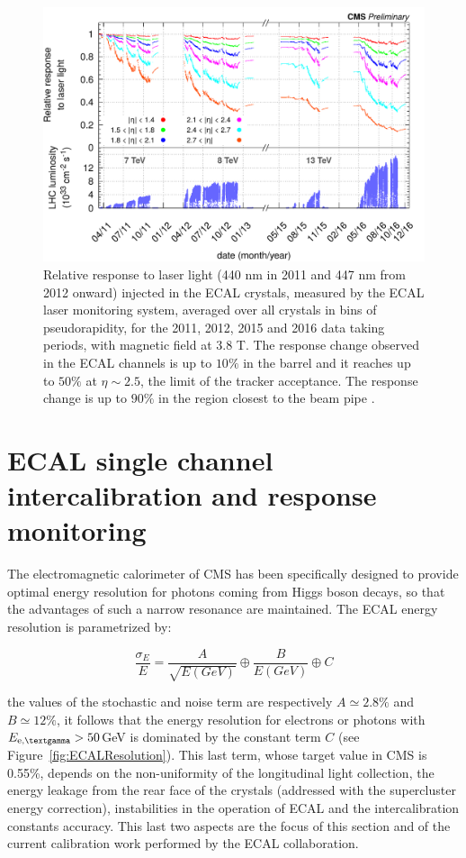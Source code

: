 \begin{figure}[h!]
  \centering
  \includegraphics[width = .9\textwidth]{figures/ecal/histories_2011-2012-2015-2016_161212.png}
  \caption{Relative response to laser light (440 nm in 2011 and 447 nm from
    2012 onward) injected in the ECAL crystals, measured by the ECAL
    laser monitoring system, averaged over all crystals in bins of
    pseudorapidity, for the 2011, 2012, 2015 and 2016 data taking periods,
    with magnetic field at 3.8 T. The response change observed in the
    ECAL channels is up to $10\%$ in the barrel and it reaches up to $50\%$ at $\eta\sim 2.5$,
    the limit of the tracker acceptance. The response change is up to $90\%$ in the region closest to the beam pipe
    \cite{laser_and_phisym}.}
  \label{fig:laser}
\end{figure}

\section{ECAL single channel intercalibration and response monitoring}
\label{sec:minchia_la_calibrazione}

The electromagnetic calorimeter of CMS has been specifically designed to provide optimal
energy resolution for photons coming from Higgs boson decays,
so that the advantages of such a narrow resonance are maintained.
The ECAL energy resolution is parametrized by:

\begin{equation}
\dfrac{\sigma_{E}}{E} = \dfrac{A}{\sqrt{E(GeV)}} \oplus
                        \dfrac{B}{E(GeV)}        \oplus
                        C
\end{equation} 

the values of the stochastic and noise term are respectively $A \simeq 2.8\%$ and $B \simeq 12\%$, it
follows that the energy resolution for electrons or photons with
$E_{\textnormal{e,\textgamma}} > 50$GeV is dominated by the constant term $C$ (see
Figure~\ref{fig:ECALResolution}). This last term, whose target value in CMS is 0.55\%, depends on
the non-uniformity of the longitudinal light collection, the energy leakage from the rear face of
the crystals (addressed with the supercluster energy correction),
instabilities in the operation of ECAL and the intercalibration constants accuracy. This last two aspects
are the focus of this section and of the current calibration work performed by the ECAL collaboration.

